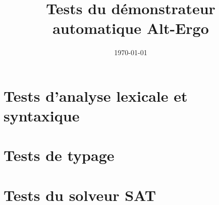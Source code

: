 \documentclass[a4paper,12pt]{article}
\title{\Large Tests du démonstrateur automatique Alt-Ergo}
\date\today
\begin{document}
\maketitle

\tableofcontents

\bigskip\bigskip

\newpage

\section{Tests d'analyse lexicale et syntaxique}







\section{Tests de typage}








\section{Tests du solveur SAT}






\end{document}
